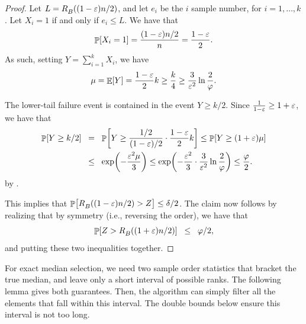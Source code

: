 \begin{proof}
    Let $L = \rankY{B}{(1-\eps)n/2}$, and let $e_i$ be the $i$\th
    sample number, for $i=1,\ldots, k$.  Let $X_i=1$ if and only if
    $e_i \leq L$. We have that
    \begin{equation*}
        \Prob{X_i =1 } = \frac{ (1-\eps)n/2}{n} = \frac{1-\eps}{2}.        
    \end{equation*}
    As such, setting $Y = \sum_{i=1}^k X_i$, we have
    \begin{equation*}
        \mu = \Ex{Y} = \frac{1-\eps}{2}  k%
        \geq%
        \frac{k}{4} \geq
        \frac{3}{\eps^2} \ln \frac{2}{\BadProb} .
    \end{equation*}

    The lower-tail failure event is contained in the event $Y \geq
    k/2$. Since $\tfrac{1}{1-{\varepsilon}} \geq 1+{\varepsilon}$, we have that
    \begin{align*}
        \Prob{Y \geq k/2}%
        &\EQ %
        \Prob{Y \geq \frac{1/2}{(1-\eps)/2} \cdot \frac{1-\eps}{2} k}%
        \leq%
        \Prob{Y \geq (1+\eps) \mu}%
        \\&
        \LEQ %
        \exp\pth{ - \frac{\eps^2 \mu}{3}}
        \leq %
        \exp\pth{ - \frac{\eps^2}{3} \cdot         \frac{3}{\eps^2} \ln \frac{2}{\BadProb} 
        }
        \leq%
        \frac{\BadProb}{2}.
    \end{align*}
    by .

    This implies that
    $\Prob{\bigl. \rankY{B}{(1-\eps)n/2} > Z } \leq \delta/2$.  The
    claim now follows by realizing that by symmetry (i.e., reversing
    the order), we have that
    \begin{equation*}
        \Prob{ Z > \rankY{B}{(1+\eps)n/2} }
        \LEQ
        \BadProb /2,
    \end{equation*}
    and putting these two inequalities together.
\end{proof}

For exact median selection, we need two sample order statistics that
bracket the true median, and leave only a short interval of possible
ranks. The following lemma gives both guarantees. Then, the algorithm can
simply filter all the elements that fall within this interval. The double
bounds below ensure this interval is not too long.

